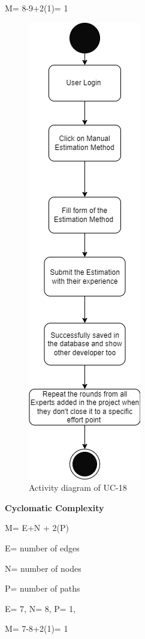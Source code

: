 M= 8-9+2(1)= 1

\begin{figure}[H]
    \centering
    \includegraphics[scale=0.7]{./diagrams/Activity Diagram/ad-18.png}
    \caption{Activity diagram of UC-18}
    \label{fig:act-18}

\end{figure}


\textbf{Cyclomatic Complexity}

M= E+N + 2(P)

E= number of edges

N= number of nodes

P= number of paths

E= 7,
N= 8,
P= 1,

M= 7-8+2(1)= 1

